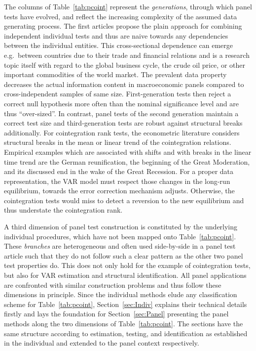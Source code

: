 The columns of Table~\ref{tab:pcoint} represent the \textit{generations}, through which panel tests have evolved, and reflect the increasing complexity of the assumed data generating process. The first articles propose the plain approach for combining independent individual tests and thus are naive towards any dependencies between the individual entities. This cross-sectional dependence can emerge e.g.~between countries due to their trade and financial relations and is a research topic itself with regard to the global business cycle, the crude oil price, or other important commodities of the world market. The prevalent data property decreases the actual information content in macroeconomic panels compared to cross-independent samples of same size. First-generation tests then reject a correct null hypothesis more often than the nominal significance level and are thus ``over-sized''. In contrast, panel tests of the second generation maintain a correct test size and third-generation tests are robust against structural breaks additionally. For cointegration rank tests, the econometric literature considers structural breaks in the mean or linear trend of the cointegration relations. Empirical examples which are associated with shifts and with breaks in the linear time trend are the German reunification, the beginning of the Great Moderation, and its discussed end in the wake of the Great Recession. For a proper data representation, the VAR model must respect those changes in the long-run equilibrium, towards the error correction mechanism adjusts. Otherwise, the cointegration tests would miss to detect a reversion to the new equilibrium and thus understate the cointegration rank.

A third dimension of panel test construction is constituted by the underlying individual procedures, which have not been mapped onto Table~\ref{tab:pcoint}. These \textit{branches} are heterogeneous and often used side-by-side in a panel test article such that they do not follow such a clear pattern as the other two panel test properties do. This does not only hold for the example of cointegration tests, but also for VAR estimation and structural identification. All panel applications are confronted with similar construction problems and thus follow these dimensions in principle. Since the individual methods elude any classification scheme for Table~\ref{tab:pcoint}, Section~\ref{sec:Indiv} explains their technical details firstly and lays the foundation for Section~\ref{sec:Panel} presenting the panel methods along the two dimensions of Table~\ref{tab:pcoint}. The sections have the same structure according to estimation, testing, and identification as established in the individual and extended to the panel context respectively.

